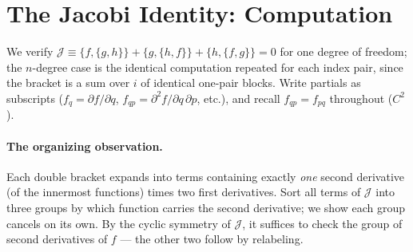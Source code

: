 \documentclass[11pt]{article}
\theoremstyle{plain}
\theoremstyle{definition}
\theoremstyle{remark}
\begin{document}
\section{The Jacobi Identity: Computation}
\label{app:jacobi}

We verify
$\mathcal J \equiv \{f,\{g,h\}\} + \{g,\{h,f\}\} + \{h,\{f,g\}\} = 0$ for
one degree of freedom; the $n$-degree case is the identical computation
repeated for each index pair, since the bracket is a sum over $i$ of
identical one-pair blocks. Write partials as subscripts
($f_q = \partial f/\partial q$, $f_{qp} = \partial^2 f/\partial
q\,\partial p$, etc.), and recall $f_{qp} = f_{pq}$ throughout ($C^2$).

\paragraph{The organizing observation.}
Each double bracket expands into terms containing exactly \emph{one}
second derivative (of the innermost functions) times two first
derivatives. Sort all terms of $\mathcal J$ into three groups by which
function carries the second derivative; we show each group cancels on its
own. By the cyclic symmetry of $\mathcal J$, it suffices to check the
group of second derivatives of $f$ --- the other two follow by relabeling.
\end{document}
